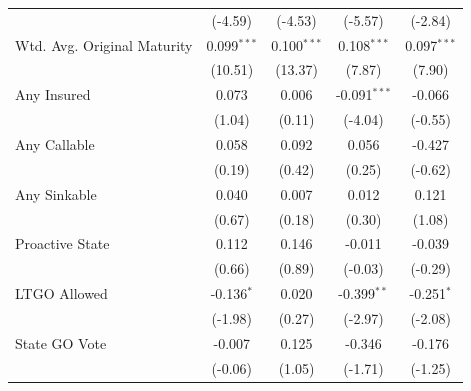 \begin{tabular*}{\textwidth}{@{\extracolsep{\fill}}lcccc}
                               & (-4.59)               & (-4.53)                      & (-5.57)                      & (-2.84)\\   
   Wtd. Avg. Original Maturity & 0.099$^{***}$          & 0.100$^{***}$                 & 0.108$^{***}$                 & 0.097$^{***}$\\   
                               & (10.51)               & (13.37)                      & (7.87)                       & (7.90)\\   
   Any Insured                 & 0.073                  & 0.006                         & -0.091$^{***}$                & -0.066\\   
                               & (1.04)                & (0.11)                       & (-4.04)                      & (-0.55)\\   
   Any Callable                & 0.058                  & 0.092                         & 0.056                         & -0.427\\   
                               & (0.19)                & (0.42)                       & (0.25)                       & (-0.62)\\   
   Any Sinkable                & 0.040                  & 0.007                         & 0.012                         & 0.121\\   
                               & (0.67)                & (0.18)                       & (0.30)                       & (1.08)\\   
   Proactive State             & 0.112                  & 0.146                         & -0.011                        & -0.039\\   
                               & (0.66)                & (0.89)                       & (-0.03)                      & (-0.29)\\   
   LTGO Allowed                & -0.136$^{*}$           & 0.020                         & -0.399$^{**}$                 & -0.251$^{*}$\\   
                               & (-1.98)               & (0.27)                       & (-2.97)                      & (-2.08)\\   
   State GO Vote               & -0.007                 & 0.125                         & -0.346                        & -0.176\\   
                               & (-0.06)               & (1.05)                       & (-1.71)                      & (-1.25)\\   

\end{tabular*}
